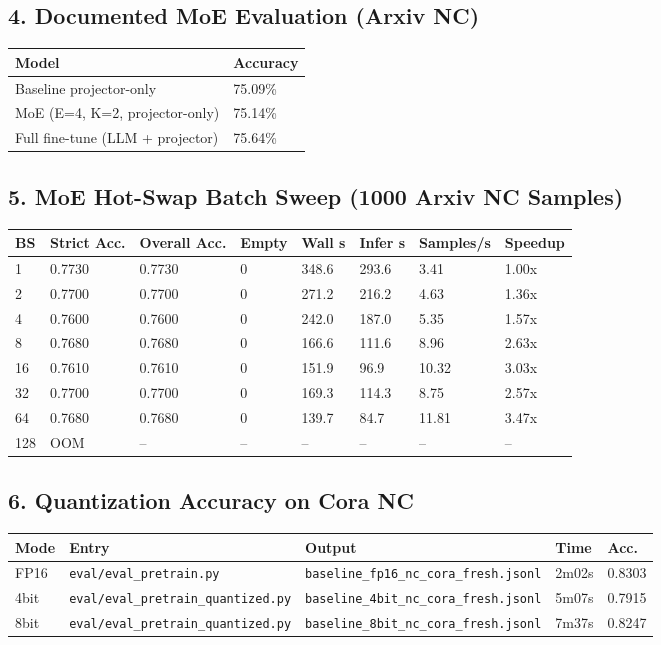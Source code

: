 \subsection*{4. Documented MoE Evaluation (Arxiv NC)}

\begin{tabular}{ll}
\toprule
Model & Accuracy \\
\midrule
Baseline projector-only & 75.09\% \\
MoE (E=4, K=2, projector-only) & 75.14\% \\
Full fine-tune (LLM + projector) & 75.64\% \\
\bottomrule
\end{tabular}

\subsection*{5. MoE Hot-Swap Batch Sweep (1000 Arxiv NC Samples)}

\begin{tabular}{llllllll}
\toprule
BS & Strict Acc. & Overall Acc. & Empty & Wall s & Infer s & Samples/s & Speedup \\
\midrule
1 & 0.7730 & 0.7730 & 0 & 348.6 & 293.6 & 3.41 & 1.00x \\
2 & 0.7700 & 0.7700 & 0 & 271.2 & 216.2 & 4.63 & 1.36x \\
4 & 0.7600 & 0.7600 & 0 & 242.0 & 187.0 & 5.35 & 1.57x \\
8 & 0.7680 & 0.7680 & 0 & 166.6 & 111.6 & 8.96 & 2.63x \\
16 & 0.7610 & 0.7610 & 0 & 151.9 & 96.9 & 10.32 & 3.03x \\
32 & 0.7700 & 0.7700 & 0 & 169.3 & 114.3 & 8.75 & 2.57x \\
64 & 0.7680 & 0.7680 & 0 & 139.7 & 84.7 & 11.81 & 3.47x \\
128 & OOM & -- & -- & -- & -- & -- & -- \\
\bottomrule
\end{tabular}

\subsection*{6. Quantization Accuracy on Cora NC}

\begin{tabular}{lllll}
\toprule
Mode & Entry & Output & Time & Acc. \\
\midrule
FP16 & \texttt{eval/eval\_pretrain.py} & \texttt{baseline\_fp16\_nc\_cora\_fresh.jsonl} & 2m02s & 0.8303 \\
4bit & \texttt{eval/eval\_pretrain\_quantized.py} & \texttt{baseline\_4bit\_nc\_cora\_fresh.jsonl} & 5m07s & 0.7915 \\
8bit & \texttt{eval/eval\_pretrain\_quantized.py} & \texttt{baseline\_8bit\_nc\_cora\_fresh.jsonl} & 7m37s & 0.8247 \\
\bottomrule
\end{tabular}

